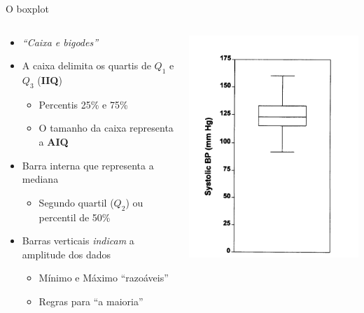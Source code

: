 \documentclass{beamer}
\begin{document}
\begin{frame}{\scriptsize O boxplot}
  \begin{columns}
    \begin{column}{7cm}
      \begin{itemize}
        \scriptsize
      \item {\em ``Caixa e bigodes''}
        \medskip
      \item A caixa delimita os quartis de $Q_1$ e $Q_3$ ({\bf IIQ})
        \begin{itemize}
          \scriptsize
        \item Percentis 25\% e 75\%
        \item O tamanho da caixa representa a {\bf AIQ}
        \end{itemize}
      \item Barra interna que representa a mediana
        \begin{itemize}
          \scriptsize
        \item Segundo quartil ($Q_2$) ou percentil de 50\%
        \end{itemize}
        \medskip
      \item Barras verticais {\em indicam} a amplitude dos dados
        \begin{itemize}
          \scriptsize
        \item Mínimo e Máximo ``razoáveis''
        \item Regras para ``a maioria''
        \end{itemize}
      \end{itemize}
    \end{column}
    \begin{column}{5cm}
      \includegraphics[height=\textheight]{Cap3/boxplot}
    \end{column}
  \end{columns}
\end{frame}
\end{document}
